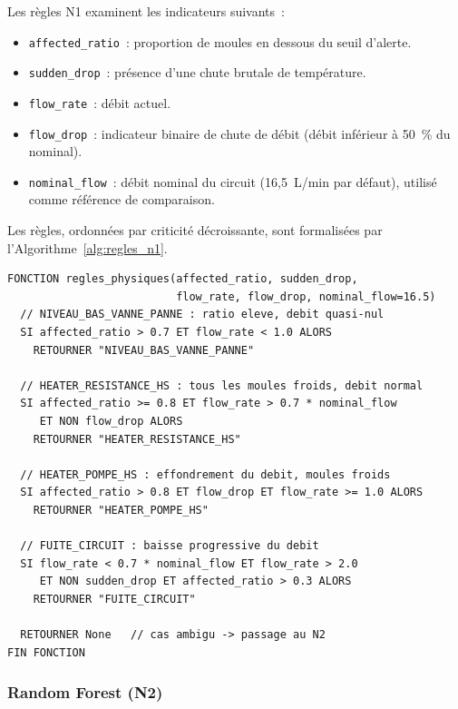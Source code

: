 Les règles N1 examinent les indicateurs suivants~:

\begin{itemize}
  \item \texttt{affected\_ratio}~: proportion de moules en dessous du seuil d'alerte.
  \item \texttt{sudden\_drop}~: présence d'une chute brutale de température.
  \item \texttt{flow\_rate}~: débit actuel.
  \item \texttt{flow\_drop}~: indicateur binaire de chute de débit (débit inférieur à 50~\% du nominal).
  \item \texttt{nominal\_flow}~: débit nominal du circuit (16,5~L/min par défaut), utilisé comme référence de comparaison.
\end{itemize}

Les règles, ordonnées par criticité décroissante, sont formalisées par l'Algorithme~\ref{alg:regles_n1}.

\begin{algorithm}[htbp]
\caption{Règles physiques de classification des causes (niveau N1)}
\label{alg:regles_n1}
\begin{minipage}{0.95\textwidth}
\begin{verbatim}
FONCTION regles_physiques(affected_ratio, sudden_drop,
                          flow_rate, flow_drop, nominal_flow=16.5)
  // NIVEAU_BAS_VANNE_PANNE : ratio eleve, debit quasi-nul
  SI affected_ratio > 0.7 ET flow_rate < 1.0 ALORS
    RETOURNER "NIVEAU_BAS_VANNE_PANNE"

  // HEATER_RESISTANCE_HS : tous les moules froids, debit normal
  SI affected_ratio >= 0.8 ET flow_rate > 0.7 * nominal_flow
     ET NON flow_drop ALORS
    RETOURNER "HEATER_RESISTANCE_HS"

  // HEATER_POMPE_HS : effondrement du debit, moules froids
  SI affected_ratio > 0.8 ET flow_drop ET flow_rate >= 1.0 ALORS
    RETOURNER "HEATER_POMPE_HS"

  // FUITE_CIRCUIT : baisse progressive du debit
  SI flow_rate < 0.7 * nominal_flow ET flow_rate > 2.0
     ET NON sudden_drop ET affected_ratio > 0.3 ALORS
    RETOURNER "FUITE_CIRCUIT"

  RETOURNER None   // cas ambigu -> passage au N2
FIN FONCTION
\end{verbatim}
\end{minipage}
\end{algorithm}

\subsubsection{Random Forest (N2)}

